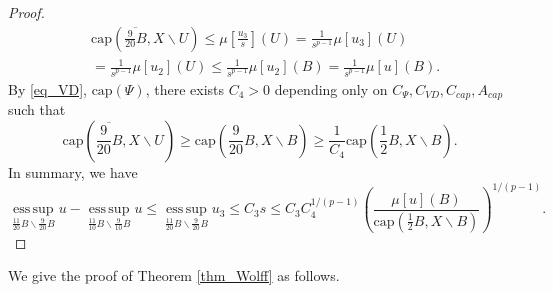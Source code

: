 \documentclass[11pt,a4paper]{article}
\numberwithin{equation}{section}
\newcommand{\esup}{\operatorname*{ess\,sup}}
\theoremstyle{plain}
\theoremstyle{definition}
\begin{document}
\begin{proof}
\begin{align*}
&\mathrm{cap}\left(\overline{\frac{9}{20}B},X\backslash U\right)\le \mu \left[\frac{u_3}{s}\right](U)=\frac{1}{s^{p-1}}\mu[u_3](U)\\
&=\frac{1}{s^{p-1}}\mu[u_2](U)\le \frac{1}{s^{p-1}}\mu[u_2](B)=\frac{1}{s^{p-1}}\mu[u](B).
\end{align*}
By \ref{eq_VD}, \hyperlink{eq_cap}{$\text{cap}(\Psi)$}, there exists $C_4>0$ depending only on $C_\Psi, C_{VD}, C_{cap}, A_{cap}$ such that
$$\mathrm{cap}\left(\overline{\frac{9}{20}B},X\backslash U\right)\ge \mathrm{cap}\left({\frac{9}{20}B},X\backslash B\right)\ge \frac{1}{C_4}\mathrm{cap}\left(\frac{1}{2}B,X\backslash B\right).$$
In summary, we have
$$\esup_{\frac{11}{20}B\backslash {\frac{9}{20}B}}u-\esup_{\frac{11}{10}B\backslash {\frac{9}{10}B}}u\le\esup_{\frac{11}{20}B\backslash {\frac{9}{20}B}}u_3\le C_3s\le C_3C_4^{1/(p-1)}\left(\frac{\mu[u](B)}{\mathrm{cap}\left(\frac{1}{2}B,X\backslash B\right)}\right)^{1/(p-1)}.$$
\end{proof}

We give the proof of Theorem \ref{thm_Wolff} as follows.
\end{document}
